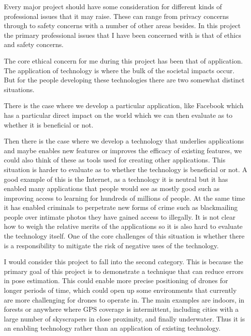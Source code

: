 \documentclass[]{../resources/final_report}
\begin{document}
Every major project should have some consideration for different kinds of professional issues that it may raise. These can range from privacy concerns through to safety concerns with a number of other areas besides. In this project the primary professional issues that I have been concerned with is that of ethics and safety concerns.

The core ethical concern for me during this project has been that of application. The application of technology is where the bulk of the societal impacts occur. But for the people developing these technologies there are two somewhat distinct situations. 

There is the case where we develop a particular application, like Facebook which has a particular direct impact on the world which we can then evaluate as to whether it is beneficial or not. 

Then there is the case where we develop a technology that underlies applications and maybe enables new features or improves the efficacy of existing features, we could also think of these as tools used for creating other applications. This situation is harder to evaluate as to whether the technology is beneficial or not. A good example of this is the Internet, as a technology it is neutral but it has enabled many applications that people would see as mostly good such as improving access to learning for hundreds of millions of people. At the same time it has enabled criminals to perpetrate new forms of crime such as blackmailing people over intimate photos they have gained access to illegally. It is not clear how to weigh the relative merits of the applications so it is also hard to evaluate the technology itself. One of the core challenges of this situation is whether there is a responsibility to mitigate the risk of negative uses of the technology.

I would consider this project to fall into the second category. This is because the primary goal of this project is to demonstrate a technique that can reduce errors in pose estimation. This could enable more precise positioning of drones for longer periods of time, which could open up some environments that currently are more challenging for drones to operate in. The main examples are indoors, in forests or anywhere where GPS coverage is intermittent, including cities with a large number of skyscrapers in close proximity, and finally underwater. Thus it is an enabling technology rather than an application of existing technology.
\end{document}
